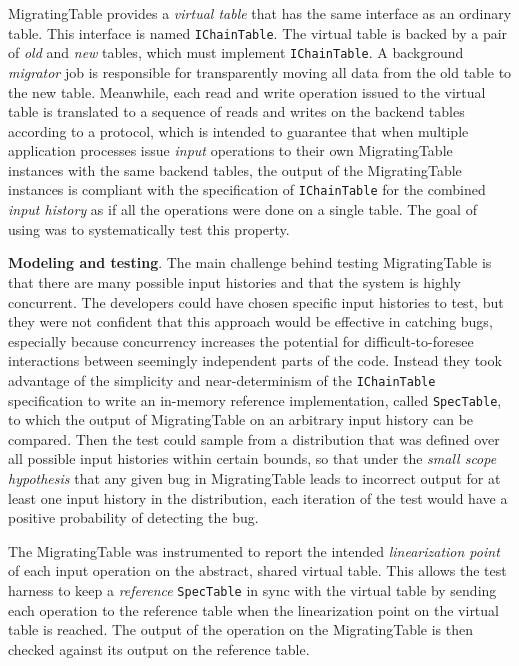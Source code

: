 MigratingTable provides a \emph{virtual table} that has the same interface as an ordinary \Azure table. This interface is named \texttt{IChainTable}. The virtual table is backed by a pair of \emph{old} and \emph{new} tables, which must implement \texttt{IChainTable}. A background \emph{migrator} job is responsible for transparently moving all data from the old table to the new table. Meanwhile, each read and write operation issued to the virtual table is translated to a sequence of reads and writes on the backend tables according to a protocol, which is intended to guarantee that when multiple application processes issue \emph{input} operations to their own MigratingTable instances with the same backend tables, the output of the MigratingTable instances is compliant with the specification of \texttt{IChainTable} for the combined \emph{input history} as if all the operations were done on a single table. The goal of using \psharp was to systematically test this property.

\textbf{Modeling and testing}.
The main challenge behind testing MigratingTable is that there are many possible input histories and that the system is highly concurrent. The developers could have chosen specific input histories to test, but they were not confident that this approach would be effective in catching bugs, especially because concurrency increases the potential for difficult-to-foresee interactions between seemingly independent parts of the code. Instead they took advantage of the simplicity and near-determinism of the \texttt{IChainTable} specification to write an in-memory reference implementation, called \texttt{SpecTable}, to which the output of MigratingTable on an arbitrary input history can be compared. Then the test could sample from a distribution that was defined over all possible input histories within certain bounds, so that under the \emph{small scope hypothesis} that any given bug in MigratingTable leads to incorrect output for at least one input history in the distribution, each iteration of the test would have a positive probability of detecting the bug.

The MigratingTable was instrumented to report the intended \emph{linearization point} of each input operation on the abstract, shared virtual table. This allows the test harness to keep a \emph{reference} \texttt{SpecTable} in sync with the virtual table by sending each operation to the reference table when the linearization point on the virtual table is reached. The output of the operation on the MigratingTable is then checked against its output on the reference table.

